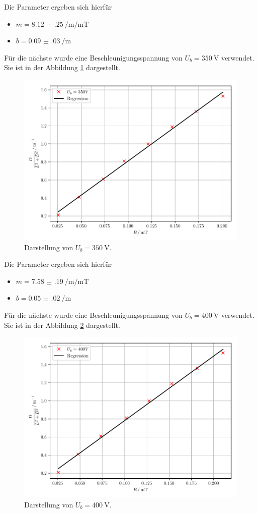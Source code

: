 Die Parameter ergeben sich hierfür
\begin{itemize}
  \item $m = \SI[per-mode=fraction]{8.12(25)}{\per\meter\per\milli\tesla}$
  \item $b =\SI[per-mode=fraction]{0.09(03)}{\per\meter}$
\end{itemize}
Für die nächste wurde eine Beschleunigungsspannung von $U_b = \SI{350}{\volt}$ verwendet.
Sie ist in der Abbildung \ref{abb:14} dargestellt.
\begin{figure}[H]
  \centering
  \includegraphics{plot9.pdf}
  \caption{Darstellung von $U_b=\SI{350}{\volt}$.}
  \label{abb:14}
\end{figure}
Die Parameter ergeben sich hierfür
\begin{itemize}
  \item $m = \SI[per-mode=fraction]{7.58(19)}{\per\meter\per\milli\tesla}$
  \item $b =\SI[per-mode=fraction]{0.05(02)}{\per\meter}$
\end{itemize}
Für die nächste wurde eine Beschleunigungsspannung von $U_b = \SI{400}{\volt}$ verwendet.
Sie ist in der Abbildung \ref{abb:15} dargestellt.
\begin{figure}[H]
  \centering
  \includegraphics{plot10.pdf}
  \caption{Darstellung von $U_b=\SI{400}{\volt}$.}
  \label{abb:15}
\end{figure}
